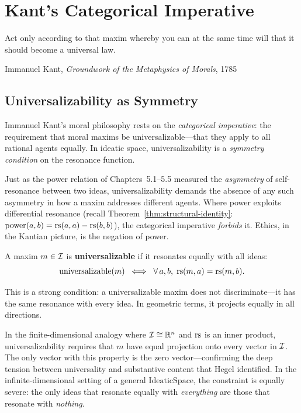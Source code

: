 
\chapter{Kant's Categorical Imperative}
\label{ch:kant}

\epigraph{Act only according to that maxim whereby you can at the same time will that it should become a universal law.}{Immanuel Kant, \textit{Groundwork of the Metaphysics of Morals}, 1785}

\section{Universalizability as Symmetry}

Immanuel Kant's moral philosophy rests on the \emph{categorical imperative}:
the requirement that moral maxims be universalizable---that they apply to all
rational agents equally. In ideatic space, universalizability is a
\emph{symmetry condition} on the resonance function.

Just as the power relation of Chapters~5.1--5.5 measured the \emph{asymmetry}
of self-resonance between two ideas, universalizability demands the absence
of any such asymmetry in how a maxim addresses different agents. Where power
exploits differential resonance (recall Theorem~\ref{thm:structural-identity}:
$\mathrm{power}(a,b) = \mathrm{rs}(a,a) - \mathrm{rs}(b,b)$), the categorical imperative
\emph{forbids} it. Ethics, in the Kantian picture, is the negation of power.

\begin{definition}[Universalizability]
\label{def:universalizable}
A maxim $m \in \mathcal{I}$ is \textbf{universalizable} if it resonates equally with
all ideas:
\[
  \mathrm{universalizable}(m) \;\iff\; \forall\, a, b,\; \mathrm{rs}(m, a) = \mathrm{rs}(m, b).
\]
\end{definition}

This is a strong condition: a universalizable maxim does not discriminate---it
has the same resonance with every idea. In geometric terms, it projects equally
in all directions.

\begin{remark}
In the finite-dimensional analogy where $\mathcal{I} \cong \mathbb{R}^n$ and $\mathrm{rs}$
is an inner product, universalizability requires that $m$ have equal projection
onto every vector in $\mathcal{I}$. The only vector with this property is the zero
vector---confirming the deep tension between universality and substantive
content that Hegel identified. In the infinite-dimensional setting of a
general $\mathrm{IdeaticSpace}$, the constraint is equally severe: the only ideas
that resonate equally with \emph{everything} are those that resonate with
\emph{nothing}.
\end{remark}

